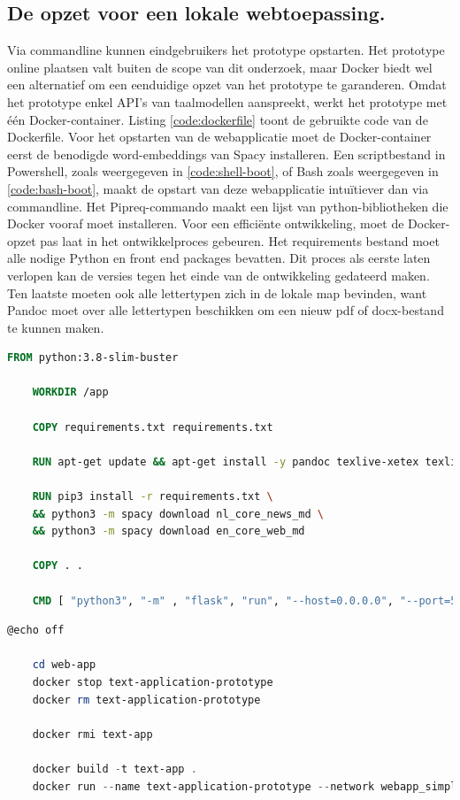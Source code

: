 \subsection{De opzet voor een lokale webtoepassing.}

Via commandline kunnen eindgebruikers het prototype opstarten. Het prototype online plaatsen valt buiten de scope van dit onderzoek, maar Docker biedt wel een alternatief om een eenduidige opzet van het prototype te garanderen. Omdat het prototype enkel API's van taalmodellen aanspreekt, werkt het prototype met één Docker-container. Listing \ref{code:dockerfile} toont de gebruikte code van de Dockerfile. Voor het opstarten van de webapplicatie moet de Docker-container eerst de benodigde word-embeddings van Spacy installeren. Een scriptbestand in Powershell, zoals weergegeven in \ref{code:shell-boot}, of Bash zoals weergegeven in \ref{code:bash-boot}, maakt de opstart van deze webapplicatie intuïtiever dan via commandline. Het Pipreq-commando maakt een lijst van python-bibliotheken die Docker vooraf moet installeren. Voor een efficiënte ontwikkeling, moet de Docker-opzet pas laat in het ontwikkelproces gebeuren. Het requirements bestand moet alle nodige Python en front end packages bevatten. Dit proces als eerste laten verlopen kan de versies tegen het einde van de ontwikkeling gedateerd maken. Ten laatste moeten ook alle lettertypen zich in de lokale map bevinden, want Pandoc moet over alle lettertypen beschikken om een nieuw pdf of docx-bestand te kunnen maken.

\begin{lstlisting}[language=Dockerfile, caption={Dockerfile voor het prototype.}, label={code:dockerfile}]
	FROM python:3.8-slim-buster
	
	WORKDIR /app
	
	COPY requirements.txt requirements.txt
	
	RUN apt-get update && apt-get install -y pandoc texlive-xetex texlive poppler-utils
	
	RUN pip3 install -r requirements.txt \
	&& python3 -m spacy download nl_core_news_md \
	&& python3 -m spacy download en_core_web_md
	
	COPY . .
	
	CMD [ "python3", "-m" , "flask", "run", "--host=0.0.0.0", "--port=5000"]
\end{lstlisting}


\begin{lstlisting}[language=Powershell, caption={Script voor het opstarten van de Docker-container voor Windows-gebruikers}, label={code:shell-boot}]
	@echo off
	
	cd web-app
	docker stop text-application-prototype
	docker rm text-application-prototype
	
	docker rmi text-app
	
	docker build -t text-app .
	docker run --name text-application-prototype --network webapp_simplification -d -p 5000:5000 text-app
\end{lstlisting}

